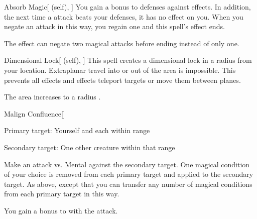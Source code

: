 \lowercase{\hypertarget{spell:Absorb Magic}{}}\label{spell:Absorb Magic}
\begin{attuneability}[Rank 6]{\hypertarget{spell:Absorb Magic}{Absorb Magic}}[ (self), ]
You gain a  bonus to defenses against  effects.
In addition, the next time a  attack beats your defenses, it has no effect on you.
When you negate an attack in this way, you regain one  and this spell's effect ends.

\rankline
{} The effect can negate two magical attacks before ending instead of only one.

\end{attuneability}
\vspace{0.25em}



\lowercase{\hypertarget{spell:Dimensional Lock}{}}\label{spell:Dimensional Lock}
\begin{attuneability}[Rank 6]{\hypertarget{spell:Dimensional Lock}{Dimensional Lock}}[ (self), ]
\targetrule
This spell creates a dimensional lock in a \arealarge radius  from your location.
Extraplanar travel into or out of the area is impossible.
This prevents all  effects and effects teleport targets or move them between planes.

\rankline
{} The area increases to a \areahuge radius .

\end{attuneability}
\vspace{0.25em}



\lowercase{\hypertarget{spell:Malign Confluence}{}}\label{spell:Malign Confluence}
\begin{freeability}[Rank 6]{\hypertarget{spell:Malign Confluence}{Malign Confluence}}[]

Primary target: Yourself and each  within \rngmed range
\par\noindent
Secondary target: One other creature within that range

Make an attack vs. Mental against the secondary target.
\hit One magical condition of your choice is removed from each primary target and applied to the secondary target.
\crit As above, except that you can transfer any number of magical conditions from each primary target in this way.

\rankline
{} You gain a  bonus to  with the attack.

\end{freeability}
\vspace{0.25em}



